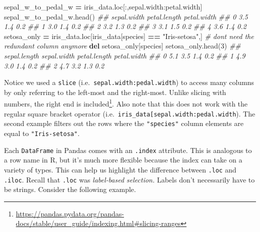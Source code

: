 \documentclass[
  12pt,
  krantz2]{krantz}
\makeatletter
\newenvironment{Shaded}{\begin{snugshade}}{\end{snugshade}}
\newcommand{\CommentTok}[1]{\textcolor[rgb]{0.37,0.37,0.37}{\textit{#1}}}
\newcommand{\DecValTok}[1]{\textcolor[rgb]{0.06,0.06,0.06}{#1}}
\newcommand{\KeywordTok}[1]{\textcolor[rgb]{0.27,0.27,0.27}{\textbf{#1}}}
\newcommand{\NormalTok}[1]{#1}
\newcommand{\OperatorTok}[1]{\textcolor[rgb]{0.43,0.43,0.43}{\textbf{#1}}}
\newcommand{\StringTok}[1]{\textcolor[rgb]{0.5,0.5,0.5}{#1}}
\renewcommand{\href}[2]{#2\footnote{\url{#1}}}
\newenvironment{kframe}{%
\medskip{}
\setlength{\fboxsep}{.8em}
 \def\at@end@of@kframe{}%
 \ifinner\ifhmode%
  \def\at@end@of@kframe{\end{minipage}}%
  \begin{minipage}{\columnwidth}%
 \fi\fi%
 \def\FrameCommand##1{\hskip\@totalleftmargin \hskip-\fboxsep
 \colorbox{shadecolor}{##1}\hskip-\fboxsep
     \hskip-\linewidth \hskip-\@totalleftmargin \hskip\columnwidth}%
 \MakeFramed {\advance\hsize-\width
   \@totalleftmargin\z@ \linewidth\hsize
   \@setminipage}}%
 {\par\unskip\endMakeFramed%
 \at@end@of@kframe}
\renewenvironment{Shaded}{\begin{kframe}}{\end{kframe}}
\makeatother
\begin{document}
\begin{Shaded}
\begin{Highlighting}[]
\NormalTok{sepal\_w\_to\_pedal\_w }\OperatorTok{=}\NormalTok{ iris\_data.loc[:,}\StringTok{\textquotesingle{}sepal.width\textquotesingle{}}\NormalTok{:}\StringTok{\textquotesingle{}petal.width\textquotesingle{}}\NormalTok{]}
\NormalTok{sepal\_w\_to\_pedal\_w.head()}
\CommentTok{\#\#    sepal.width  petal.length  petal.width}
\CommentTok{\#\# 0          3.5           1.4          0.2}
\CommentTok{\#\# 1          3.0           1.4          0.2}
\CommentTok{\#\# 2          3.2           1.3          0.2}
\CommentTok{\#\# 3          3.1           1.5          0.2}
\CommentTok{\#\# 4          3.6           1.4          0.2}
\NormalTok{setosa\_only }\OperatorTok{=}\NormalTok{ iris\_data.loc[iris\_data[}\StringTok{\textquotesingle{}species\textquotesingle{}}\NormalTok{] }\OperatorTok{==} \StringTok{"Iris{-}setosa"}\NormalTok{,]}
\CommentTok{\# don\textquotesingle{}t need the redundant column anymore}
\KeywordTok{del}\NormalTok{ setosa\_only[}\StringTok{\textquotesingle{}species\textquotesingle{}}\NormalTok{]}
\NormalTok{setosa\_only.head(}\DecValTok{3}\NormalTok{)}
\CommentTok{\#\#    sepal.length  sepal.width  petal.length  petal.width}
\CommentTok{\#\# 0           5.1          3.5           1.4          0.2}
\CommentTok{\#\# 1           4.9          3.0           1.4          0.2}
\CommentTok{\#\# 2           4.7          3.2           1.3          0.2}
\end{Highlighting}
\end{Shaded}

Notice we used a \texttt{slice} (i.e.~\texttt{\textquotesingle{}sepal.width\textquotesingle{}:\textquotesingle{}pedal.width\textquotesingle{}}) to access many columns by only referring to the left-most and the right-most. Unlike slicing with numbers, \href{https://pandas.pydata.org/pandas-docs/stable/user_guide/indexing.html\#slicing-ranges}{the right end is included}. Also note that this does not work with the regular square bracket operator (i.e.~\texttt{iris\_data{[}\textquotesingle{}sepal.width\textquotesingle{}:\textquotesingle{}pedal.width\textquotesingle{}{]}}). The second example filters out the rows where the \texttt{"species"} column elements are equal to \texttt{"Iris-setosa"}.

Each \texttt{DataFrame} in Pandas comes with an \texttt{.index} attribute. This is analogous to a row name in R, but it's much more flexible because the index can take on a variety of types. This can help us highlight the difference between \texttt{.loc} and \texttt{.iloc}. Recall that \texttt{.loc} was \emph{label-based selection.} Labels don't necessarily have to be strings. Consider the following example.
\end{document}
